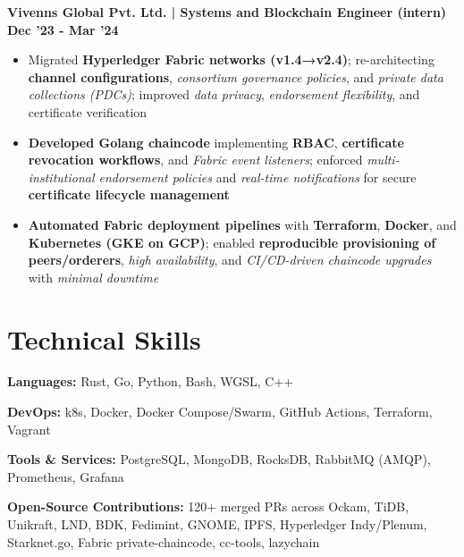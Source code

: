 \documentclass[11pt,a4paper]{article}
\newcommand{\job}[3]{
  \textbf{#1 | #2} \hfill \textbf{#3}
}
\newcommand{\skillcat}[2]{
  \textbf{#1:} #2
}
\begin{document}
\job{Vivenns Global Pvt. Ltd.}{Systems and Blockchain Engineer (intern)}{Dec '23 - Mar '24}
{\footnotesize
\begin{itemize}
    \item Migrated \textbf{Hyperledger Fabric networks (v1.4→v2.4)}; re-architecting \textbf{channel configurations}, \textit{consortium governance policies}, and \textit{private data collections (PDCs)}; improved \textit{data privacy}, \textit{endorsement flexibility}, and certificate verification
    
    \item \textbf{Developed Golang chaincode} implementing \textbf{RBAC}, \textbf{certificate revocation workflows}, and \textit{Fabric event listeners}; enforced \textit{multi-institutional endorsement policies} and \textit{real-time notifications} for secure \textbf{certificate lifecycle management}

    \item \textbf{Automated Fabric deployment pipelines} with \textbf{Terraform}, \textbf{Docker}, and \textbf{Kubernetes (GKE on GCP)}; enabled \textbf{reproducible provisioning of peers/orderers}, \textit{high availability}, and \textit{CI/CD-driven chaincode upgrades} with \textit{minimal downtime}


\end{itemize}
}

\section*{Technical Skills}

\skillcat{Languages}{Rust, Go, Python, Bash, WGSL, C++}

\skillcat{DevOps} {k8s, Docker, Docker Compose/Swarm, GitHub Actions, Terraform, Vagrant}

\skillcat{Tools \& Services} {PostgreSQL, MongoDB, RocksDB, RabbitMQ (AMQP), Prometheus, Grafana}

\skillcat{Open-Source Contributions}{120+ merged PRs across Ockam, TiDB, Unikraft, LND, BDK, Fedimint, GNOME, IPFS, Hyperledger Indy/Plenum, Starknet.go, Fabric private-chaincode, cc-tools, lazychain}
\end{document}
